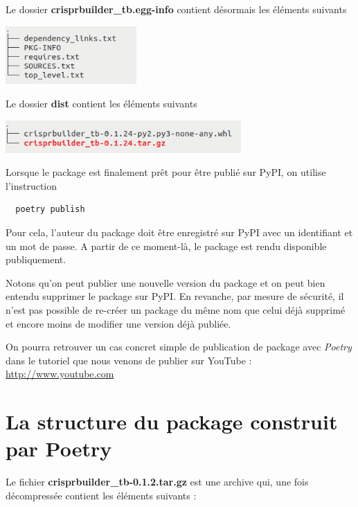 \documentclass[twoside,a4paper,11pt,frenchb,openany]{report}
\begin{document}
Le dossier \textbf{crisprbuilder\_tb.egg-info} contient désormais les éléments suivants

\includegraphics[width=5cm]{rep_crispr_egg.png}

Le dossier \textbf{dist} contient les éléments suivants

\includegraphics[width=9cm]{rep_dist.png}

Lorsque le package est finalement prêt pour être publié sur PyPI, on utilise l’instruction
\begin{verbatim}  poetry publish\end{verbatim}
Pour cela, l'auteur du package doit être enregistré sur PyPI avec un identifiant et un mot de passe. A partir de ce moment-là, le package est rendu disponible publiquement.

Notons qu'on peut publier une nouvelle version du package et on peut bien entendu supprimer le package sur PyPI. En revanche, par mesure de sécurité, il n'est pas possible de re-créer un package du même nom que celui déjà supprimé et encore moins de modifier une version déjà publiée. 

On pourra retrouver un cas concret simple de publication de package avec \textit{Poetry} dans le tutoriel que nous venons de publier sur YouTube : \href{http://www.youtube.com}{http://www.youtube.com}





\section{La structure du package construit par Poetry}

Le fichier \textbf{crisprbuilder\_tb-0.1.2.tar.gz} est une archive qui, une fois décompressée contient les éléments suivants :
\end{document}
